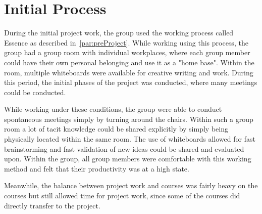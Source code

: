 \section{Initial Process}
During the initial project work, the group used the working process called Essence as described in~\autoref{par:preProject}.
While working using this process, the group had a group room with individual workplaces, where each group member could have their own personal belonging and use it as a "home base".
Within the room, multiple whiteboards were available for creative writing and work.
During this period, the initial phases of the project was conducted, where many meetings could be conducted.

While working under these conditions, the group were able to conduct spontaneous meetings simply by turning around the chairs.
Within such a group room a lot of tacit knowledge could be shared explicitly by simply being physically located within the same room.
The use of whiteboards allowed for fast brainstorming and fast validation of new ideas could be shared and evaluated upon.
Within the group, all group members were comfortable with this working method and felt that their productivity was at a high state. 

Meanwhile, the balance between project work and courses was fairly heavy on the courses but still allowed time for project work, since some of the courses did directly transfer to the project.
